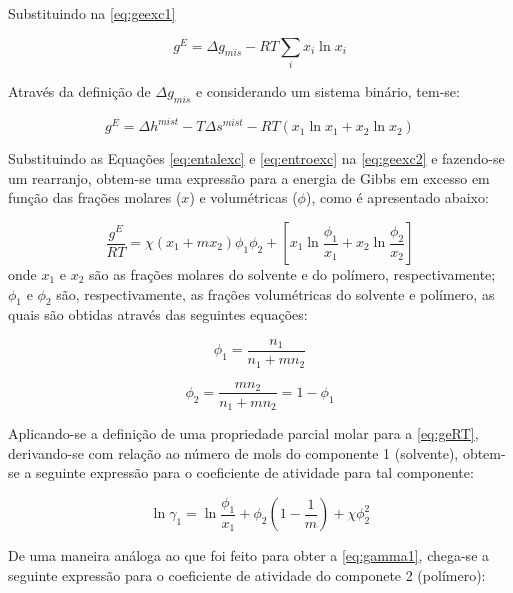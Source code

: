 Substituindo na \autoref{eq:geexc1}

\begin{equation}
g^E = \Delta g_{mis} - RT\sum_ix_i\ln x_i
\end{equation}

Através da definição de $\Delta g_{mis}$ e considerando um sistema binário,
tem-se:

\begin{equation}\label{eq:geexc2}
g^E = \Delta h^{mist} - T\Delta s^{mist} - RT\left( x_1\ln x_1 + x_2\ln x_2
\right)
\end{equation}

Substituindo as Equações \ref{eq:entalexc} e \ref{eq:entroexc} na
\autoref{eq:geexc2} e fazendo-se um rearranjo, obtem-se uma expressão para a
energia de Gibbs em excesso em função das frações molares ($x$) e volumétricas ($\phi$), como é apresentado abaixo:

\begin{equation}\label{eq:geRT}
\frac{g^E}{RT} = \chi\left(x_1 + mx_2\right)\phi_1\phi_2 +
\left[x_1\ln\frac{\phi_1}{x_1} + x_2\ln\frac{\phi_2}{x_2}\right]
\end{equation}
onde $x_1$ e $x_2$ são as frações molares do solvente e do polímero,
respectivamente; $\phi_1$ e $\phi_2$ são, respectivamente, as frações
volumétricas do solvente e polímero, as quais são obtidas através das
seguintes equações:

\begin{equation}
\phi_1 = \frac{n_1}{n_1 + mn_2}
\end{equation}

\begin{equation}
\phi_2 = \frac{mn_2}{n_1 + mn_2} = 1 - \phi_1
\end{equation}

Aplicando-se a definição de uma propriedade parcial molar para a
\autoref{eq:geRT}, derivando-se com relação ao número de mols do componente 1
(solvente), obtem-se a seguinte expressão para o coeficiente de atividade para tal
componente:


\begin{equation}\label{eq:gamma1}
\ln\gamma_1 = \ln\frac{\phi_1}{x_1} + \phi_2\left( 1 - \frac{1}{m} \right) +
\chi\phi_2^2
\end{equation}

De uma maneira análoga ao que foi feito para obter a \autoref{eq:gamma1},
chega-se a seguinte expressão para o coeficiente de atividade do componete 2 (polímero):

